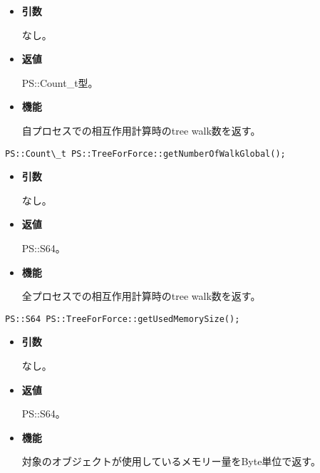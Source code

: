 \begin{itemize}

\item {\bf 引数}

なし。

\item {\bf 返値}

PS::Count\_t型。

\item {\bf 機能}

自プロセスでの相互作用計算時のtree walk数を返す。

\end{itemize}

\begin{screen}
\begin{verbatim}
PS::Count\_t PS::TreeForForce::getNumberOfWalkGlobal();
\end{verbatim}
\end{screen}

\begin{itemize}

\item {\bf 引数}

なし。

\item {\bf 返値}

PS::S64。

\item {\bf 機能}

全プロセスでの相互作用計算時のtree walk数を返す。

\end{itemize}

\begin{screen}
\begin{verbatim}
PS::S64 PS::TreeForForce::getUsedMemorySize();
\end{verbatim}
\end{screen}

\begin{itemize}

\item {\bf 引数}

なし。

\item {\bf 返値}

PS::S64。

\item {\bf 機能}

対象のオブジェクトが使用しているメモリー量をByte単位で返す。

\end{itemize}



